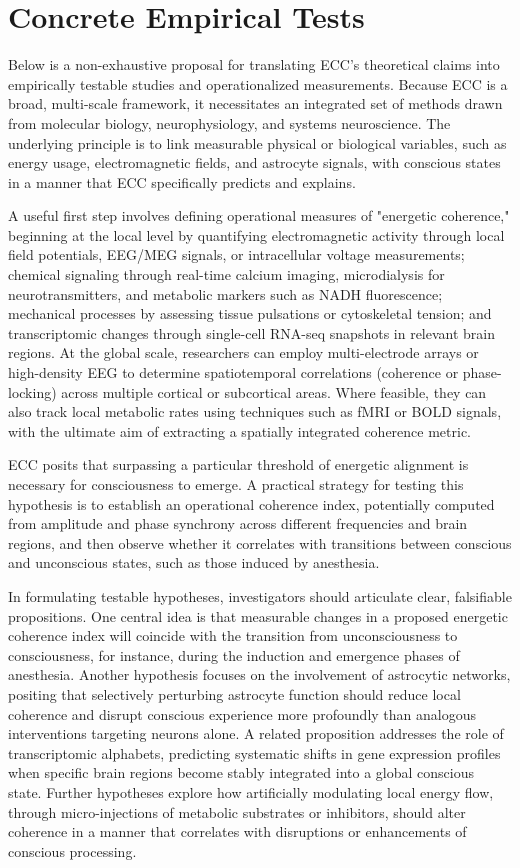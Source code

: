 \section{Concrete Empirical Tests}

Below is a non-exhaustive proposal for translating ECC’s theoretical claims into empirically testable studies and operationalized measurements. Because ECC is a broad, multi-scale framework, it necessitates an integrated set of methods drawn from molecular biology, neurophysiology, and systems neuroscience. The underlying principle is to link measurable physical or biological variables, such as energy usage, electromagnetic fields, and astrocyte signals, with conscious states in a manner that ECC specifically predicts and explains.

A useful first step involves defining operational measures of "energetic coherence," beginning at the local level by quantifying electromagnetic activity through local field potentials, EEG/MEG signals, or intracellular voltage measurements; chemical signaling through real-time calcium imaging, microdialysis for neurotransmitters, and metabolic markers such as NADH fluorescence; mechanical processes by assessing tissue pulsations or cytoskeletal tension; and transcriptomic changes through single-cell RNA-seq snapshots in relevant brain regions. At the global scale, researchers can employ multi-electrode arrays or high-density EEG to determine spatiotemporal correlations (coherence or phase-locking) across multiple cortical or subcortical areas. Where feasible, they can also track local metabolic rates using techniques such as fMRI or BOLD signals, with the ultimate aim of extracting a spatially integrated coherence metric.

ECC posits that surpassing a particular threshold of energetic alignment is necessary for consciousness to emerge. A practical strategy for testing this hypothesis is to establish an operational coherence index, potentially computed from amplitude and phase synchrony across different frequencies and brain regions, and then observe whether it correlates with transitions between conscious and unconscious states, such as those induced by anesthesia.

In formulating testable hypotheses, investigators should articulate clear, falsifiable propositions. One central idea is that measurable changes in a proposed energetic coherence index will coincide with the transition from unconsciousness to consciousness, for instance, during the induction and emergence phases of anesthesia. Another hypothesis focuses on the involvement of astrocytic networks, positing that selectively perturbing astrocyte function should reduce local coherence and disrupt conscious experience more profoundly than analogous interventions targeting neurons alone. A related proposition addresses the role of transcriptomic alphabets, predicting systematic shifts in gene expression profiles when specific brain regions become stably integrated into a global conscious state. Further hypotheses explore how artificially modulating local energy flow, through micro-injections of metabolic substrates or inhibitors, should alter coherence in a manner that correlates with disruptions or enhancements of conscious processing.

